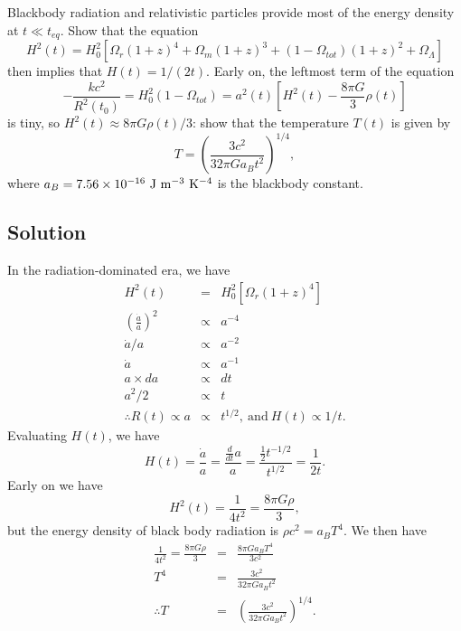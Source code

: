 \documentclass[]{article}
\begin{document}
Blackbody radiation and relativistic particles provide most of the
energy density at $t\ll t_{eq}$. Show that the equation
\begin{equation}
H^2(t) = H_0^2[\Omega_r(1+z)^4 + \Omega_m(1+z)^3 + (1 -\Omega_{tot})(1+z)^2 + \Omega_{\Lambda}]
\end{equation}
\noindent
then implies that $H(t)=1/(2t)$. Early on, the leftmost term of the
equation
\begin{equation}
-\frac{kc^2}{R^2(t_0)} = H_0^2(1-\Omega_{tot}) = a^2(t)\left[H^2(t) - \frac{8\pi G}{3} \rho(t)\right]
\end{equation}
\noindent
is tiny, so $H^2(t)\approx8\pi G\rho(t)/3$: show that the temperature $T(t)$ is
given by
\begin{equation}
T = \left(\frac{3c^2}{32 \pi G a_B t^2}\right)^{1/4},
\end{equation}
where $a_B = 7.56\times 10^{-16}~\mathrm{J}~\mathrm{m}^{-3}~\mathrm{K}^{-4}$ is the blackbody constant.

\subsection{Solution}

In the radiation-dominated era, we have
\begin{eqnarray}
H^{2}(t) &=& H_0^2\left[\Omega_r(1+z)^4\right]\\
\left(\frac{\dot{a}}{a}\right)^2&\propto& a^{-4} \\
\dot{a}/a &\propto& a^{-2}\\
\dot{a} &\propto& a^{-1}\\
a \times da &\propto& dt\\
a^2 / 2 &\propto& t\\
\therefore R(t) \propto a &\propto& t^{1/2},~\mathrm{and}~H(t)\propto1/t.
\end{eqnarray}
\noindent
Evaluating $H(t)$, we have
\begin{equation}
H(t) = \frac{\dot{a}}{a} = \frac{\frac{d}{dt} a}{a} = \frac{\frac{1}{2}t^{-1/2}}{t^{1/2}} = \frac{1}{2t}.
\end{equation}
\noindent
Early on we have
\begin{equation}
H^{2}(t) = \frac{1}{4t^2} = \frac{8\pi G \rho}{3},
\end{equation}
\noindent
but the energy density of black body radiation is $\rho c^2 = a_B T^{4}$.
We then have
\begin{eqnarray}
\frac{1}{4t^2} = \frac{8\pi G \rho}{3} &=& \frac{8\pi G a_B T^4}{3c^2}\\
T^{4} &=& \frac{3 c^2}{32\pi G a_B t^2}\\
\therefore T &=& \left(\frac{3 c^2}{32\pi G a_B t^2}\right)^{1/4}.
\end{eqnarray}
\end{document}
